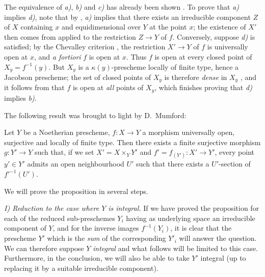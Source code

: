 The equivalence of \emph{a)}, \emph{b)} and \emph{c)} has already been shown .
To prove that \emph{a)} implies \emph{d)}, note that by , \emph{a)} implies that there exists an irreducible component $Z$ of $X$ containing $x$ and equidimensional over $Y$ at the point $x$; the existence of $X'$ then comes from  applied to the restriction $Z\to Y$ of $f$.
Conversely, suppose \emph{d)} is satisfied; by the Chevalley criterion , the restriction $X'\to Y$ of $f$ is universally open at $x$, and \emph{a fortiori} $f$ is open at $x$. Thus $f$ is open at every closed point of $X_y=f^{-1}(y)$.
But $X_y$ is a $\kappa(y)$-prescheme locally of finite type, hence a Jacobson prescheme; the set of closed points of $X_y$ is therefore \emph{dense} in $X_y$ , and it follows from  that $f$ is open at \emph{all} points of $X_y$, which finishes proving that \emph{d)} implies \emph{b)}.

The following result was brought to light by D.\ Mumford:

\begin{proposition}[14.5.10]
\label{IV.14.5.10}
Let $Y$ be a Noetherian prescheme, $f:X\to Y$ a morphism universally open, surjective and locally of finite type.
Then there exists a finite surjective morphism $g:Y'\to Y$ such that, if we set $X'=X\times_Y Y'$ and $f'=f_{(Y')}:X'\to Y'$, every point $y'\in Y'$ admits an open neighbourhood $U'$ such that there exists a $U'$-section of $f'^{-1}(U')$.
\end{proposition}

We will prove the proposition in several steps.

\emph{I) Reduction to the case where $Y$ is integral.}
If we have proved the proposition for each of the reduced sub-preschemes $Y_i$ having as underlying space an irreducible component of $Y$, and for the inverse images $f^{-1}(Y_i)$, it is clear that the prescheme $Y'$ which is the \emph{sum} of the corresponding $Y'_i$ will answer the question.
We can therefore suppose $Y$ \emph{integral} and what follows will be limited to this case.
Furthermore, in the conclusion, we will also be able to take $Y'$ integral (up to replacing it by a suitable irreducible component).


